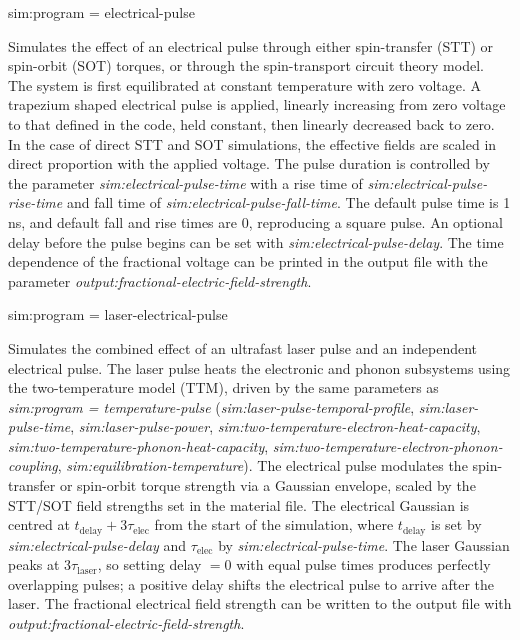 {\zicf sim:program = electrical-pulse}
Simulates the effect of an electrical pulse through either spin-transfer (STT) or
spin-orbit (SOT) torques, or through the spin-transport circuit theory model. The
system is first equilibrated at constant temperature with zero voltage. A
trapezium shaped electrical pulse is applied, linearly increasing from zero
voltage to that defined in the code, held constant, then linearly decreased back
to zero. In the case of direct STT and SOT simulations, the effective fields are
scaled in direct proportion with the applied voltage. The pulse duration is
controlled by the parameter \textit{sim:electrical-pulse-time}
with a rise time of \textit{sim:electrical-pulse-rise-time} and fall time of
\textit{sim:electrical-pulse-fall-time}. The default pulse time is 1 ns, and
default fall and rise times are 0, reproducing a square pulse. An optional delay
before the pulse begins can be set with \textit{sim:electrical-pulse-delay}. The time
dependence of the fractional voltage can be printed in the output file with the
parameter \textit{output:fractional-electric-field-strength}.

{\zicf sim:program = laser-electrical-pulse}
Simulates the combined effect of an ultrafast laser pulse and an independent electrical pulse.
The laser pulse heats the electronic and phonon subsystems using the two-temperature model (TTM),
driven by the same parameters as \textit{sim:program = temperature-pulse}
(\textit{sim:laser-pulse-temporal-profile}, \textit{sim:laser-pulse-time}, \textit{sim:laser-pulse-power},
\textit{sim:two-temperature-electron-heat-capacity}, \textit{sim:two-temperature-phonon-heat-capacity},
\textit{sim:two-temperature-electron-phonon-coupling}, \textit{sim:equilibration-temperature}).
The electrical pulse modulates the spin-transfer or spin-orbit torque strength via a Gaussian envelope,
scaled by the STT/SOT field strengths set in the material file.
The electrical Gaussian is centred at $t_\mathrm{delay} + 3\tau_\mathrm{elec}$ from the start of the simulation,
where $t_\mathrm{delay}$ is set by \textit{sim:electrical-pulse-delay} and $\tau_\mathrm{elec}$ by
\textit{sim:electrical-pulse-time}.
The laser Gaussian peaks at $3\tau_\mathrm{laser}$, so setting delay $= 0$ with equal pulse times produces
perfectly overlapping pulses; a positive delay shifts the electrical pulse to arrive after the laser.
The fractional electrical field strength can be written to the output file with
\textit{output:fractional-electric-field-strength}.

